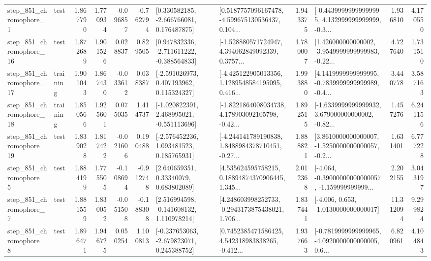 \begin{tabular}{llrrrrllrlrr}
   step\_851\_chromophore\_1 &      test &      1.867790 &    1.770934 &     -0.096857 & -0.762794 &    [0.330582185, -2.666766081, 0.176487875] &  [0.5187757096167478, -4.599675130536437, 0.104... &       1.943375 &  [-0.44399999999999995, 4.132999999999999, -0.3... &            1.936810 &          4.170550 \\
  step\_851\_chromophore\_16 &      test &      1.872689 &    1.901526 &      0.028837 &  0.829505 &   [0.947832336, -2.711611222, -0.388564833] &  [-1.528880571724947, 4.394062849092339, 0.3757... &       1.780007 &  [1.426000000000002, -3.9549999999999983, -0.22... &            4.727640 &          1.731510 \\
  step\_851\_chromophore\_17 &  training &      1.901043 &    1.867430 &     -0.033612 &  0.038387 &    [-2.591026973, 0.407193962, 0.115324327] &  [-4.425122905013356, 1.1289548584195095, 0.416... &       1.993880 &  [4.1419999999999995, -0.7839999999999989, -0.4... &            3.440778 &          3.587163 \\
  step\_851\_chromophore\_18 &  training &      1.850566 &    1.925601 &      0.075035 &  1.414737 &   [-1.020822391, 2.468995021, -0.551113696] &  [-1.8221864008034738, 4.178903092105798, -0.42... &       1.892515 &  [-1.6339999999999932, 3.679000000000002, -0.82... &            1.457276 &          6.241156 \\
  step\_851\_chromophore\_19 &      test &      1.839028 &    1.817422 &     -0.021606 &  0.190488 &    [-2.576452236, 1.093481523, 0.185765931] &  [-4.244141789190838, 1.8488984378710451, -0.27... &       1.888821 &  [3.8610000000000007, -1.5250000000000057, -0.2... &            1.631401 &          6.777228 \\
   step\_851\_chromophore\_5 &      test &      1.884199 &    1.775505 &     -0.108694 & -0.912748 &      [2.640659351, 0.33340079, 0.683802089] &  [4.535624595758215, 0.18894874370906445, 1.345... &       2.012368 &  [-4.064, -0.39000000000000057, -1.159999999999... &            2.202155 &          3.043197 \\
   step\_851\_chromophore\_7 &      test &      1.881559 &    1.830052 &     -0.051508 & -0.188308 &    [2.516994598, -0.141608132, 1.110978214] &  [4.248603998252733, -0.2943173875438021, 1.706... &       1.837441 &               [-4.006, 0.653, -1.0130000000000017] &           11.312094 &          9.299824 \\
   step\_851\_chromophore\_8 &      test &      1.896471 &    1.946725 &      0.050254 &  1.100813 &   [-0.237653063, -2.679823071, 0.245388752] &  [0.7452385471586425, 4.542318983838265, -0.412... &       1.937663 &  [-0.7819999999999965, -4.0920000000000005, 0.6... &            6.820961 &          4.104843 \\

\end{tabular}
